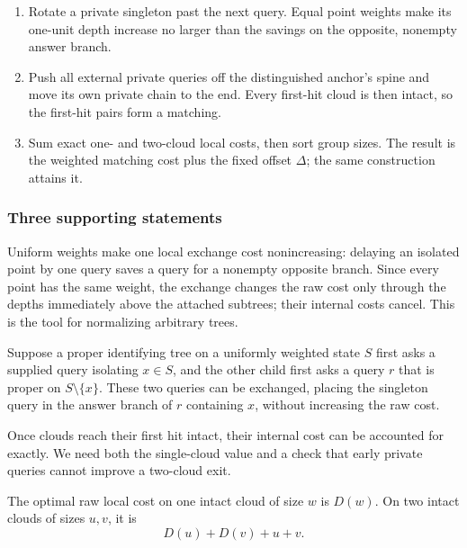 \begin{proofstrategy}
\begin{enumerate}
\item Rotate a private singleton past the next query. Equal point
weights make its one-unit depth increase no larger than the savings
on the opposite, nonempty answer branch.
\item Push all external private queries off the distinguished anchor's
spine and move its own private chain to the end. Every first-hit cloud
is then intact, so the first-hit pairs form a matching.
\item Sum exact one- and two-cloud local costs, then sort group sizes.
The result is the weighted matching cost plus the fixed offset
$\Delta$; the same construction attains it.
\end{enumerate}
\end{proofstrategy}

\subsubsection{Three supporting statements}

Uniform weights make one local exchange cost nonincreasing: delaying
an isolated point by one query saves a query for a nonempty opposite
branch. Since every point has the same weight, the exchange changes
the raw cost only through the depths immediately above the attached
subtrees; their internal costs cancel. This is the tool for
normalizing arbitrary trees.

\begin{lemma}\label{lem:uniform-singleton-rotation}
Suppose a proper identifying tree on a uniformly weighted state $S$
first asks a supplied query isolating $x\in S$, and the other child
first asks a query $r$ that is proper on $S\setminus\{x\}$.
These two queries can be exchanged, placing the singleton query
in the answer branch of $r$ containing $x$, without increasing
the raw cost.
\end{lemma}
Once clouds reach their first hit intact, their internal cost can
be accounted for exactly. We need both the single-cloud value and
a check that early private queries cannot improve a two-cloud exit.

\begin{lemma}\label{lem:uniform-cloud-local}
The optimal raw local cost on one intact cloud of size $w$ is
$D(w)$. On two intact clouds of sizes $u,v$, it is
\[
 D(u)+D(v)+u+v.
\]
\end{lemma}

